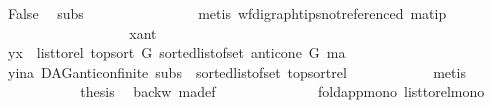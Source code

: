 \begin{isabellebody}
\ False\ \isamarkupfalse%
\ subs{\isacharparenleft}{\kern0pt}{}{\isacharparenright}{\kern0pt}\ \ {}{\isacharparenleft}{\kern0pt}{}{\isacharparenright}{\kern0pt}\isanewline
\ \ \ \ \ \ \ \ \ \ \ \ \isamarkupfalse%
\ {\isacharparenleft}{\kern0pt}metis\ wf{\isacharunderscore}{\kern0pt}digraph{\isachardot}{\kern0pt}tips{\isacharunderscore}{\kern0pt}not{\isacharunderscore}{\kern0pt}referenced\ ma{\isacharunderscore}{\kern0pt}tip{\isacharparenright}{\kern0pt}\ \ \isanewline
\ \ \ \ \ \ \ \ \isamarkupfalse%
\isanewline
\ \ \ \ \ \ \ \ \isamarkupfalse%
\ x{\isacharunderscore}{\kern0pt}ant\isanewline
\ \ \ \ \ \ \ \ \isamarkupfalse%
\ \isamarkupfalse%
\ {\isachardoublequoteopen}{\isacharparenleft}{\kern0pt}y{\isacharcomma}{\kern0pt}x{\isacharparenright}{\kern0pt}\ {\isasymin}\ list{\isacharunderscore}{\kern0pt}to{\isacharunderscore}{\kern0pt}rel\ {\isacharparenleft}{\kern0pt}top{\isacharunderscore}{\kern0pt}sort\ G\ {\isacharparenleft}{\kern0pt}sorted{\isacharunderscore}{\kern0pt}list{\isacharunderscore}{\kern0pt}of{\isacharunderscore}{\kern0pt}set\ {\isacharparenleft}{\kern0pt}anticone\ G\ ma{\isacharparenright}{\kern0pt}{\isacharparenright}{\kern0pt}{\isacharparenright}{\kern0pt}{\isachardoublequoteclose}\isanewline
\ \ \ \ \ \ \ \ \ \ \isamarkupfalse%
\ y{\isacharunderscore}{\kern0pt}ina\ DAG{\isachardot}{\kern0pt}anticon{\isacharunderscore}{\kern0pt}finite\ subs{\isacharparenleft}{\kern0pt}{}{\isacharparenright}{\kern0pt}\ {}{\isacharparenleft}{\kern0pt}{}{\isacharcomma}{\kern0pt}{}{\isacharparenright}{\kern0pt}\ sorted{\isacharunderscore}{\kern0pt}list{\isacharunderscore}{\kern0pt}of{\isacharunderscore}{\kern0pt}set{\isacharparenleft}{\kern0pt}{}{\isacharparenright}{\kern0pt}\ top{\isacharunderscore}{\kern0pt}sort{\isacharunderscore}{\kern0pt}rel\isanewline
\ \ \ \ \ \ \ \ \ \ \isamarkupfalse%
\ metis\isanewline
\ \ \ \ \ \ \ \ \isamarkupfalse%
\ \isamarkupfalse%
\ {\isacharquery}{\kern0pt}thesis\ \isamarkupfalse%
\ backw\ ma{\isacharunderscore}{\kern0pt}def\ \ \isamarkupfalse%
\isanewline
\ \ \ \ \ \ \ \ \ \ \ \ fold{\isacharunderscore}{\kern0pt}app{\isacharunderscore}{\kern0pt}mono\ list{\isacharunderscore}{\kern0pt}to{\isacharunderscore}{\kern0pt}rel{\isacharunderscore}{\kern0pt}mono{}\isanewline
\ \ \ \ \ \ \ \ \ \ \isamarkupfalse%

\end{isabellebody}

